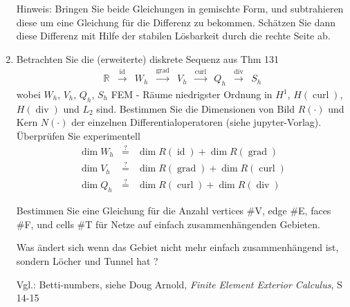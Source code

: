 \documentclass[11pt,a4paper]{report}
\newcommand{\setR}{\mathbb{R}}
\newcommand{\opgrad}{\operatorname{grad}}
\newcommand{\opdiv}{\operatorname{div}}
\newcommand{\opcurl}{\operatorname{curl}}
\begin{document}
\begin{enumerate}
Hinweis: Bringen Sie beide Gleichungen in gemischte Form, und
subtrahieren diese um eine Gleichung f\"ur die Differenz zu
bekommen. Sch\"atzen Sie dann diese Differenz mit Hilfe der stabilen
L\"osbarkeit durch die rechte Seite ab.

\item Betrachten Sie die (erweiterte) diskrete Sequenz aus Thm 131
  $$
  \begin{array}{ccccccccc}
    \setR &  \stackrel{\operatorname{id}}{\longrightarrow}          &
W_h             &      \stackrel{\opgrad}{\longrightarrow}          &
V_h             &      \stackrel{\opcurl}{\longrightarrow}   &
Q_h             &      \stackrel{\opdiv}{\longrightarrow}    & 
S_h                                                                                    
\end{array}
$$
wobei $W_h$, $V_h$, $Q_h$, $S_h$ FEM - R\"aume niedrigster Ordnung in
$H^1$, $H(\opcurl)$, $H(\opdiv)$ und $L_2$ sind. Bestimmen Sie die
Dimensionen von Bild $R(\cdot)$ und Kern $N(\cdot)$ der einzelnen
Differentialoperatoren (siehe jupyter-Vorlag). \"Uberpr\"ufen Sie experimentell
\begin{eqnarray*}
    \operatorname{dim} W_h & \stackrel{?}{=}   & \operatorname{dim}
                                               R(\operatorname{id}) +
                                               \operatorname{dim}
                                               R(\opgrad)  \\
  \operatorname{dim} V_h & \stackrel{?}{=}   & \operatorname{dim}
                                               R(\opgrad) +
                                               \operatorname{dim}
                                               R(\opcurl)  \\
  \operatorname{dim} Q_h & \stackrel{?}{=}   & \operatorname{dim}
                                               R(\opcurl) +
                                               \operatorname{dim}
                                               R(\opdiv)  
\end{eqnarray*}

Bestimmen Sie eine Gleichung f\"ur die Anzahl vertices \#V, edge \#E, faces \#F, und
cells \#T f\"ur Netze auf einfach zusammenh\"angenden Gebieten. 

Was \"andert sich wenn das Gebiet nicht mehr einfach zusammenh\"angend
ist, sondern L\"ocher und Tunnel hat ? 

Vgl.: Betti-numbers,  siehe  Doug Arnold, {\em Finite Element Exterior
  Calculus}, S 14-15


\end{enumerate}
\end{document}

